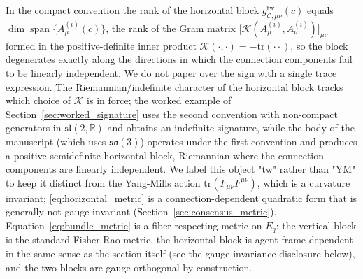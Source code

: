 \documentclass[11pt]{article}
\begin{document}
In the compact convention the rank of the horizontal block $g^{\mathrm{tw}}_{\mathcal{C},\mu\nu}(c)$ equals $\dim\operatorname{span}\{A^{(i)}_\mu(c)\}$, the rank of the Gram matrix $\big[\mathcal{K}(A^{(i)}_\mu, A^{(i)}_\nu)\big]_{\mu\nu}$ formed in the positive-definite inner product $\mathcal{K}(\cdot,\cdot) = -\mathrm{tr}(\cdot\cdot)$, so the block degenerates exactly along the directions in which the connection components fail to be linearly independent.
We do not paper over the sign with a single trace expression. The Riemannian/indefinite character of the horizontal block tracks which choice of $\mathcal{K}$ is in force; the worked example of Section~\ref{sec:worked_signature} uses the second convention with non-compact generators in $\mathfrak{sl}(2,\mathbb{R})$ and obtains an indefinite signature, while the body of the manuscript (which uses $\mathfrak{so}(3)$) operates under the first convention and produces a positive-semidefinite horizontal block, Riemannian where the connection components are linearly independent. We label this object "$\mathrm{tw}$" rather than "$\mathrm{YM}$" to keep it distinct from the Yang-Mills action $\mathrm{tr}(F_{\mu\nu}F^{\mu\nu})$, which is a curvature invariant; \eqref{eq:horizontal_metric} is a connection-dependent quadratic form that is generally not gauge-invariant (Section~\ref{sec:consensus_metric}). Equation~\eqref{eq:bundle_metric} is a fiber-respecting metric on $E_q$: the vertical block is the standard Fisher-Rao metric, the horizontal block is agent-frame-dependent in the same sense as the section itself (see the gauge-invariance disclosure below), and the two blocks are gauge-orthogonal by construction.
\end{document}
